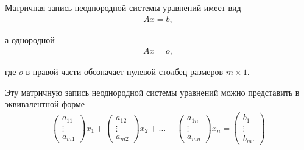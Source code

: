 \documentclass[%
	11pt,
	a4paper,
	utf8,
		]{article}
\begin{document}
Матричная запись неоднородной системы уравнений имеет вид
\vspace*{-3mm}
\begin{align*}
	A x = b,
\end{align*}

\vspace*{-3mm}
а однородной
\vspace*{-3mm}
\begin{align*}
	A x = o,
\end{align*}

\vspace*{-3mm}
где $ o $ в правой части обозначает нулевой столбец размеров $ m \times 1 $.

Эту матричную запись неоднородной системы уравнений можно представить в эквивалентной форме
\begin{align*}
	\begin{pmatrix}
		a_{11} \\
		\vdots \\
		a_{m1}
	\end{pmatrix} x_1 + 
    \begin{pmatrix}
    	a_{12} \\
    	\vdots \\
    	a_{m2}
    \end{pmatrix} x_2 + \ldots +
    \begin{pmatrix}
    	a_{1n} \\
    	\vdots \\
    	a_{mn}
    \end{pmatrix} x_n = 
    \begin{pmatrix}
    	b_1 \\
    	\vdots \\
    	b_m.
    \end{pmatrix}
\end{align*}
\end{document}
